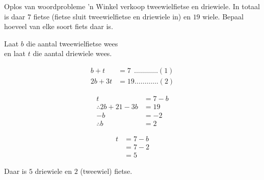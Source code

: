 \begin{wex}
{Oplos van woordprobleme}
{
 ’n Winkel verkoop tweewielfietse en driewiele. In totaal is daar $7$ fietse (fietse sluit tweewielfietse en driewiele in) en $19$ wiele. Bepaal hoeveel van elke soort fiets daar is.\\
}
{
Laat $b$ die aantal tweewielfietse wees  \\
en laat $t$  die aantal driewiele wees. 

\begin{align*}
  b + t &= 7 ~~\ldots \ldots \ldots \ldots (1)\\
  2b + 3t &= 19 \ldots \ldots \ldots \ldots (2)
\end{align*}

\begin{align*}
  t &= 7-b \\
  \therefore 2b + 21 - 3b &= 19 \\
  -b &= -2 \\
  \therefore b &= 2
\end{align*}

\begin{align*}
  t &= 7-b \\
    &= 7-2 \\
    &= 5
\end{align*}

Daar is $5$ driewiele en $2$ (tweewiel) fietse.
}       
\end{wex}

